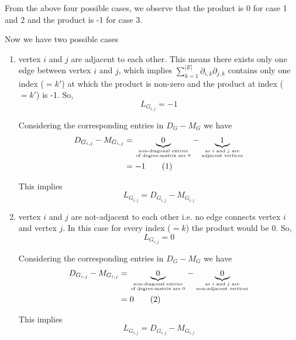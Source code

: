 \documentclass[12pt,a4paper]{article}
\newcommand\numberthis{\addtocounter{equation}{1}\tag{\theequation}}
\begin{document}
From the above four possible cases, we observe that the product is 0 for case 1 and 2 and the product is -1 for case 3.

Now we have two possible cases
\begin{enumerate}
    \item vertex $i$ and $j$ are adjacent to each other. This means there exists only one edge between vertex $i$ and $j$, which implies $\sum\limits_{k=1}^{|E|} \partial_{i,k}\partial_{j,k}$ contains only one index ($=k'$) at which the product is non-zero and the product at index ($=k'$) is -1. So,
    \begin{equation}
        L_{G_{i,j}} = -1 \label{eq:14}
    \end{equation}
    
    Considering the corresponding entries in $D_G - M_G$ we have
    \begin{align*}
        D_{G_{i,j}} - M_{G_{i,j}} &= \underbrace{0}_{\text{non-diagonal entries}\atop\text{of  degree-matrix are 0}} - \underbrace{1}_{\text{as $i$ and $j$ are}\atop\text{adjacent vertices}} \\
                                  &= -1 \label{eq:15} \numberthis
    \end{align*}
    
    This implies
    \begin{equation}
        L_{G_{i,j}} = D_{G_{i,j}} - M_{G_{i,j}} \label{eq:first}
    \end{equation}
    
    \item vertex $i$ and $j$ are not-adjacent to each other i.e. no edge connects vertex $i$ and vertex $j$. In this case for every index ($=k$) the product would be 0. So,
    \begin{equation}
        L_{G_{i,j}} = 0 \label{eq:16}
    \end{equation}
    
    Considering the corresponding entries in $D_G - M_G$ we have
    \begin{align*}
        D_{G_{i,j}} - M_{G_{i,j}} &= \underbrace{0}_{\text{non-diagonal entries}\atop\text{of  degree-matrix are 0}} - \underbrace{0}_{\text{as $i$ and $j$ are}\atop\text{non-adjacent vertices}} \\
                                  &= 0 \label{eq:17} \numberthis
    \end{align*}
    
    This implies
    \begin{equation}
        L_{G_{i,j}} = D_{G_{i,j}} - M_{G_{i,j}} \label{eq:second}
    \end{equation}
\end{enumerate}
\end{document}
